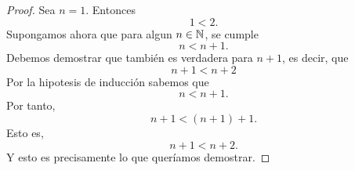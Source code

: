 \documentclass[12pt,a4paper]{article}
\begin{document}
    \begin{proof}
        Sea $n=1$. Entonces
        \begin{equation*}
            1\lt 2.
        \end{equation*}
        Supongamos ahora que para algun $n\in\mathbb{N}$, se cumple
        \begin{equation*}
            n\lt n+1.
        \end{equation*}
        Debemos demostrar que también es verdadera para $n+1$, es decir, que
        \begin{equation*}
            n+1\lt n+2
        \end{equation*}
        Por la hipotesis de inducción sabemos que
        \begin{equation*}
            n\lt n+1.
        \end{equation*}
        Por tanto,
        \begin{equation*}
            n+1\lt (n+1)+1.
        \end{equation*}
        Esto es,
        \begin{equation*}
            n+1\lt n+2.
        \end{equation*}
        Y esto es precisamente lo que queríamos demostrar.
    \end{proof}
\end{document}
